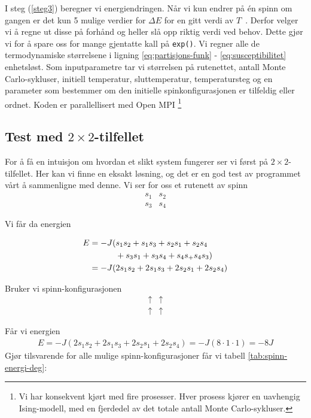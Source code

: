 \documentclass[11pt]{article}
\begin{document}
I steg (\ref{steg3}) beregner vi energiendringen. Når vi kun endrer på
én spinn om gangen er det kun 5 mulige verdier for $\Delta E$ for en
gitt verdi av $T$~\cite[s. 436]{Lecture-notes}. Derfor velger vi å
regne ut disse på forhånd og heller slå opp riktig verdi ved
behov. Dette gjør vi for å spare oss for mange gjentatte kall på \texttt{exp()}. Vi regner alle de termodynamiske størrelsene
i ligning \eqref{eq:partisjons-funk} - \eqref{eq:susceptibilitet} enhetsløst. 
 Som inputparametre tar vi størrelsen på rutenettet, antall Monte Carlo-sykluser,
initiell temperatur, sluttemperatur, temperatursteg og en parameter som bestemmer om den initielle
spinkonfigurasjonen er tilfeldig eller ordnet. Koden er parallellisert med Open MPI \footnote{Vi har konsekvent kjørt med fire
prosesser. Hver prosess kjører en uavhengig Ising-modell, med en fjerdedel av det totale antall Monte Carlo-sykluser. }

\subsection{Test med $2 \times 2$-tilfellet}
For å få en intuisjon om hvordan et slikt system fungerer ser vi først på 
$2 \times 2$-tilfellet. Her kan vi finne en eksakt løsning, og det er en god test
av programmet vårt å sammenligne med denne. Vi ser for oss et rutenett av spinn
\begin{align*}
s_1 & s_2 \\
s_3 & s_4  
\end{align*}

Vi får da energien

\begin{align*}
E &= -J ( s_1s_2 + s_1s_3 + s_2s_1 + s_2s_4 \\
&  \hspace{1.1cm}+ s_3s_1 + s_3s_4 + s_4s_ + s_4s_3) \\ 
&= - J  ( 2s_1s_2 + 2s_1s_3 + 2s_2s_1 + 2s_2s_4 ) 
\end{align*}

Bruker vi spinn-konfigurasjonen
\begin{align*}
\uparrow & \uparrow \\
\uparrow & \uparrow
\end{align*}

Får vi energien 
\begin{align*}
E = - J  ( 2s_1s_2 + 2s_1s_3 + 2s_2s_1 + 2s_2s_4 ) = -J ( 8 \cdot 1 \cdot 1) = -8J  
\end{align*}
Gjør tilsvarende for alle mulige spinn-konfigurasjoner får vi tabell \ref{tab:spinn-energi-deg}:
\end{document}
